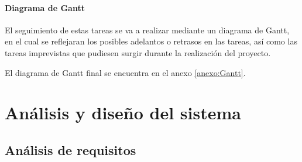 \documentclass{article}
\begin{document}
\paragraph{Diagrama de Gantt}
El seguimiento de estas tareas se va a realizar mediante un diagrama de Gantt,
en el cual se reflejaran los posibles adelantos o retrasos en las tareas, así
como las tareas imprevistas que pudiesen surgir durante la realización del
proyecto.

El diagrama de Gantt final se encuentra en el anexo \ref{anexo:Gantt}.


\section{Análisis y diseño del sistema}
\subsection{Análisis de requisitos}
\end{document}
